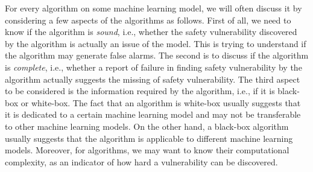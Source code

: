 \begin{partbacktext}
For every algorithm on some machine learning model, we will often discuss it by considering a few aspects of the algorithms as follows. First of all, we need to know if the algorithm is \emph{sound}, i.e., whether the safety vulnerability discovered by the algorithm is actually an issue of the model. This is trying to understand if the algorithm may generate false alarms. The second is to discuss if the algorithm is \emph{complete}, i.e., whether a report of failure in finding safety vulnerability by the algorithm actually suggests the missing of safety vulnerability. The third aspect to be considered is the information required by the algorithm, i.e., if it is black-box or white-box. The fact that an algorithm is white-box usually suggests that it is dedicated to a certain machine learning model and may not be transferable to other machine learning models. On the other hand, a black-box algorithm usually suggests that the algorithm is applicable to different machine learning models. Moreover, for algorithms, we may want to know their computational complexity, as an indicator of how hard a vulnerability can be discovered. 



\end{partbacktext}
